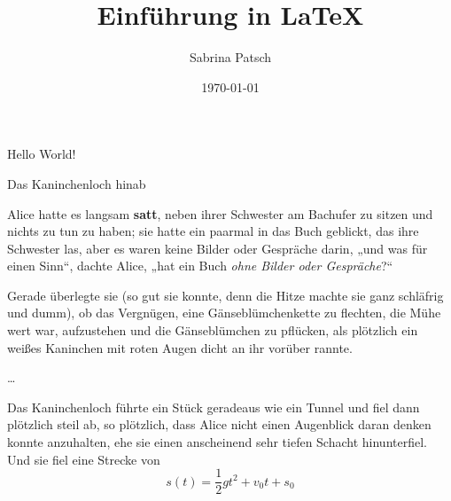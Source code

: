 \documentclass[12pt, a4paper]{article}
\title{Einführung in \LaTeX}
\author{Sabrina Patsch}
\date{\today}
\begin{document}
\maketitle

Hello World!

\begin{center}
    \LARGE Das Kaninchenloch hinab
\end{center}

Alice hatte es langsam \textbf{satt}, neben ihrer Schwester am Bachufer zu sitzen und nichts zu tun zu haben; sie hatte ein paarmal in das Buch geblickt, das ihre Schwester las, aber es waren {\Large keine Bilder oder Gespräche} darin, „und was für einen Sinn“, dachte Alice, „hat ein Buch \textsl{ohne Bilder oder Gespräche}?“

\begin{flushright}
    Gerade überlegte sie {\tiny (so gut sie konnte, denn die Hitze machte sie ganz schläfrig und dumm)}, ob das Vergnügen, eine Gänseblümchenkette zu flechten, die Mühe wert war, aufzustehen und die Gänseblümchen zu pflücken, als plötzlich ein weißes Kaninchen mit roten Augen dicht an ihr vorüber rannte.
\end{flushright}
\begin{center}
    \dots %
\end{center}

Das Kaninchenloch führte ein Stück geradeaus wie ein Tunnel und fiel dann plötzlich steil ab, so plötzlich,
dass Alice nicht einen Augenblick daran denken konnte anzuhalten, ehe sie einen anscheinend sehr tiefen
Schacht hinunterfiel. Und sie fiel eine Strecke von
\begin{equation}
    s(t) = \frac{1}{2} gt^2 + v_0 t + s_0
\end{equation}
\end{document}

